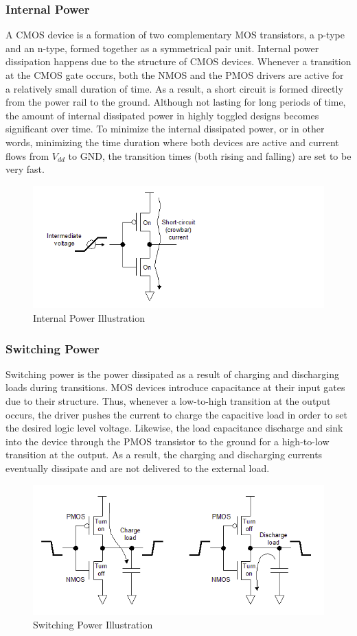 \subsubsection{Internal Power}
A CMOS device is a formation of two complementary MOS transistors,
a p-type and an n-type, formed together as a symmetrical
pair unit. 
Internal power dissipation happens due to the structure of
CMOS devices. 
Whenever a transition at the CMOS gate occurs, 
both the NMOS and the PMOS drivers are active for a 
relatively small duration of time. As a result, 
a short circuit is formed directly from the power rail to the ground. 
Although not lasting for long periods of time, 
the amount of internal dissipated power in highly toggled 
designs becomes significant over time. 
To minimize the internal dissipated power, 
or in other words, minimizing the time duration where 
both devices are active and current flows from \(V_{dd}\) to GND, 
the transition times (both rising and falling) are set to be very fast.

\begin{figure}[H]
    \centering
    \includegraphics[width=0.75\linewidth]{Features/images/int_power_schem}
    \caption{Internal Power Illustration}\label{fig:int_power_schem}
\end{figure}

\subsubsection{Switching Power}
Switching power is the power dissipated as a result 
of charging and discharging loads during transitions. 
MOS devices introduce capacitance at their input gates 
due to their structure. 
Thus, whenever a low-to-high transition at the output occurs, 
the driver pushes the current to charge the capacitive 
load in order to set the desired logic level voltage. 
Likewise, the load capacitance discharge and sink into the 
device through the PMOS transistor to the ground 
for a high-to-low transition at the output. 
As a result, the charging and discharging currents 
eventually dissipate and are not delivered to the external load.

\begin{figure}[H]
    \centering
    \includegraphics[width=0.75\linewidth]{Features/images/sw_power_schem}
    \caption{Switching Power Illustration}\label{fig:sw_power_schem}
\end{figure}